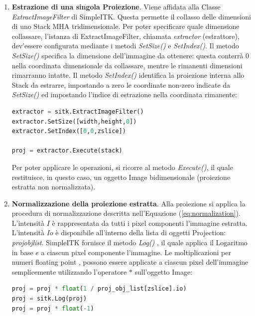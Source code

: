 \documentclass[a4paper,12pt, doubleside]{report}
\begin{document}
                \begin{enumerate}
                    \item \textbf{Estrazione di una singola Proiezione}. Viene affidata alla Classe \textit{ExtractImageFilter} \cite{sitk-estractor} di SimpleITK. Questa permette il collasso delle dimensioni di uno Stack MHA tridimensionale. Per poter specificare quale dimensione collassare, l'istanza di ExtractImageFilter, chiamata \textit{extractor} (estrattore), dev'essere configurata mediante i metodi \textit{SetSize()} e \textit{SetIndex()}. Il metodo \textit{SetSize()} specifica la dimensione dell'immagine da ottenere: questa conterrà $0$ nella coordinata dimensionale da collassare, mentre le rimanenti dimensioni rimarranno intatte. Il metodo \textit{SetIndex()} identifica la proiezione interna allo Stack da estrarre, impostando a zero le coordinate non-zero indicate da \textit{SetSize()} ed impostando l'indice di estrazione nella coordinata rimanente:
                    
                    \begin{lstlisting}[language=python, frame=bt]
extractor = sitk.ExtractImageFilter()
extractor.SetSize([width,height,0])
extractor.SetIndex([0,0,zslice])

proj = extractor.Execute(stack)
                    \end{lstlisting} 
                    
                    Per poter applicare le operazioni, si ricorre al metodo \textit{Execute()}, il quale restituisce, in questo caso, un oggetto Image bidimensionale (proiezione estratta non normalizzata).
                    
                    \item \textbf{Normalizzazione della proiezione estratta}. Alla proiezione si applica la procedura di normalizzazione descritta nell'Equazione (\ref{eq:normalization}). L'intensità $I$ è rappresentata da tutti i pixel componenti l'immagine estratta. L'intensità $Io$ è disponibile all'interno della lista di oggetti Projection: \textit{proj\textunderscore obj\textunderscore list}. SimpleITK fornisce il metodo \textit{Log()} \cite{sitk-log}, il quale applica il Logaritmo in base $e$ a ciascun pixel componente l'immagine. 
                    Le moltiplicazioni per numeri floating point \cite{python-floating-point}, possono essere applicate a ciascun pixel dell'immagine semplicemente utilizzando l'operatore $*$ \cite{sitk-star-operator} sull'oggetto Image:
                    \begin{lstlisting}[language=python, frame=bt]
proj = proj * float(1 / proj_obj_list[zslice].io)
proj = sitk.Log(proj)
proj = proj * float(-1)
                    \end{lstlisting}
                    

\end{enumerate}
\end{document}
